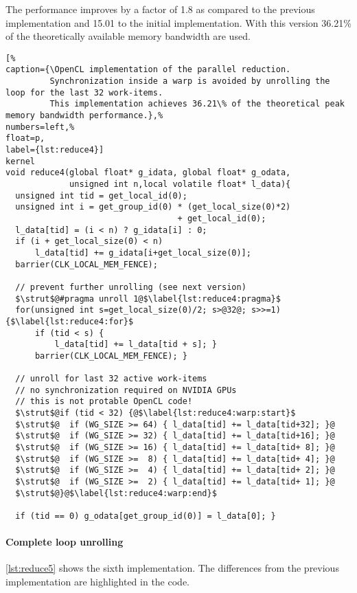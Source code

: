 The performance improves by a factor of 1.8 as compared to the previous implementation and 15.01 to the initial implementation.
With this version 36.21\% of the theoretically available memory bandwidth are used.

\begin{lstlisting}[%                                                             
caption={\OpenCL implementation of the parallel reduction.
         Synchronization inside a warp is avoided by unrolling the loop for the last 32 work-items.
         This implementation achieves 36.21\% of the theoretical peak memory bandwidth performance.},%
numbers=left,%
float=p,
label={lst:reduce4}]
kernel
void reduce4(global float* g_idata, global float* g_odata,
             unsigned int n,local volatile float* l_data){
  unsigned int tid = get_local_id(0);
  unsigned int i = get_group_id(0) * (get_local_size(0)*2)
                                   + get_local_id(0);
  l_data[tid] = (i < n) ? g_idata[i] : 0;
  if (i + get_local_size(0) < n) 
      l_data[tid] += g_idata[i+get_local_size(0)];  
  barrier(CLK_LOCAL_MEM_FENCE);

  // prevent further unrolling (see next version)
  $\strut$@#pragma unroll 1@$\label{lst:reduce4:pragma}$
  for(unsigned int s=get_local_size(0)/2; s>@32@; s>>=1) {$\label{lst:reduce4:for}$
      if (tid < s) {
          l_data[tid] += l_data[tid + s]; }
      barrier(CLK_LOCAL_MEM_FENCE); }

  // unroll for last 32 active work-items
  // no synchronization required on NVIDIA GPUs
  // this is not protable OpenCL code!
  $\strut$@if (tid < 32) {@$\label{lst:reduce4:warp:start}$
  $\strut$@  if (WG_SIZE >= 64) { l_data[tid] += l_data[tid+32]; }@
  $\strut$@  if (WG_SIZE >= 32) { l_data[tid] += l_data[tid+16]; }@
  $\strut$@  if (WG_SIZE >= 16) { l_data[tid] += l_data[tid+ 8]; }@
  $\strut$@  if (WG_SIZE >=  8) { l_data[tid] += l_data[tid+ 4]; }@
  $\strut$@  if (WG_SIZE >=  4) { l_data[tid] += l_data[tid+ 2]; }@
  $\strut$@  if (WG_SIZE >=  2) { l_data[tid] += l_data[tid+ 1]; }@
  $\strut$@}@$\label{lst:reduce4:warp:end}$

  if (tid == 0) g_odata[get_group_id(0)] = l_data[0]; }
\end{lstlisting}

\paragraph{Complete loop unrolling}

\autoref{lst:reduce5} shows the sixth implementation.
The differences from the previous implementation are highlighted in the code.

